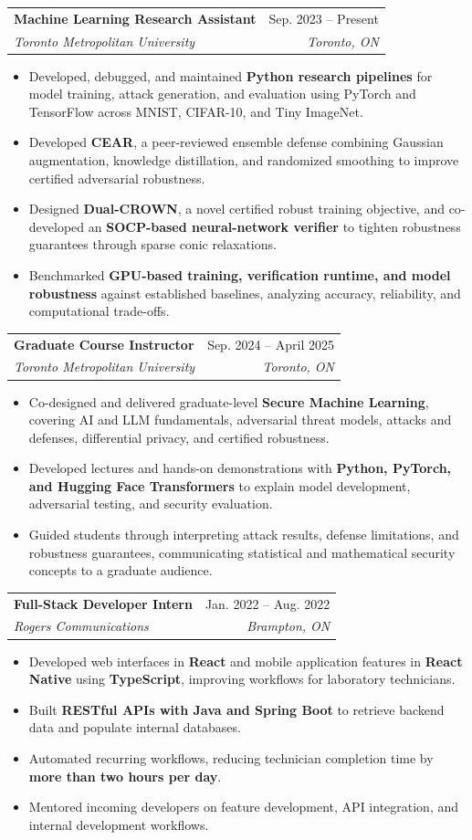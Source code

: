 \documentclass[letterpaper,11pt]{article}
\makeatletter
\newcommand{\resumeItem}[1]{
  \item\small{
    {#1 \vspace{-2pt}}
  }
}
\newcommand{\resumeSubheading}[4]{
  \vspace{-2pt}\item
    \begin{tabular*}{0.97\textwidth}[t]{l@{\extracolsep{\fill}}r}
      \textbf{#1} & #2 \\
      \textit{\small #3} & \textit{\small #4} \\
    \end{tabular*}\vspace{-7pt}
}
\newcommand{\resumeItemListStart}{
  \begin{itemize}[leftmargin=0.28in]
}
\newcommand{\resumeItemListEnd}{\end{itemize}\vspace{-5pt}}
\makeatother
\begin{document}
  \resumeSubheading
    {Machine Learning Research Assistant}{Sep. 2023 -- Present}
    {Toronto Metropolitan University}{Toronto, ON}
    \resumeItemListStart
      \resumeItem{Developed, debugged, and maintained \textbf{Python research pipelines} for model training, attack generation, and evaluation using PyTorch and TensorFlow across MNIST, CIFAR-10, and Tiny ImageNet.}
      \resumeItem{Developed \textbf{CEAR}, a peer-reviewed ensemble defense combining Gaussian augmentation, knowledge distillation, and randomized smoothing to improve certified adversarial robustness.}
      \resumeItem{Designed \textbf{Dual-CROWN}, a novel certified robust training objective, and co-developed an \textbf{SOCP-based neural-network verifier} to tighten robustness guarantees through sparse conic relaxations.}
      \resumeItem{Benchmarked \textbf{GPU-based training, verification runtime, and model robustness} against established baselines, analyzing accuracy, reliability, and computational trade-offs.}
    \resumeItemListEnd

  \resumeSubheading
    {Graduate Course Instructor}{Sep. 2024 -- April 2025}
    {Toronto Metropolitan University}{Toronto, ON}
    \resumeItemListStart
      \resumeItem{Co-designed and delivered graduate-level \textbf{Secure Machine Learning}, covering AI and LLM fundamentals, adversarial threat models, attacks and defenses, differential privacy, and certified robustness.}
      \resumeItem{Developed lectures and hands-on demonstrations with \textbf{Python, PyTorch, and Hugging Face Transformers} to explain model development, adversarial testing, and security evaluation.}
      \resumeItem{Guided students through interpreting attack results, defense limitations, and robustness guarantees, communicating statistical and mathematical security concepts to a graduate audience.}
    \resumeItemListEnd

  \resumeSubheading
    {Full-Stack Developer Intern}{Jan. 2022 -- Aug. 2022}
    {Rogers Communications}{Brampton, ON}
    \resumeItemListStart
      \resumeItem{Developed web interfaces in \textbf{React} and mobile application features in \textbf{React Native} using \textbf{TypeScript}, improving workflows for laboratory technicians.}
      \resumeItem{Built \textbf{RESTful APIs with Java and Spring Boot} to retrieve backend data and populate internal databases.}
      \resumeItem{Automated recurring workflows, reducing technician completion time by \textbf{more than two hours per day}.}
      \resumeItem{Mentored incoming developers on feature development, API integration, and internal development workflows.}
    \resumeItemListEnd
\end{document}
